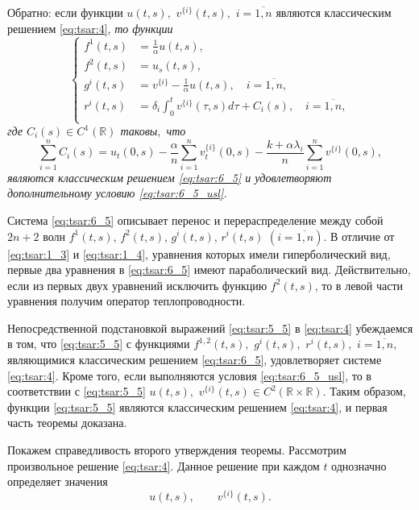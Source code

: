 Обратно: если функции $u(t,s),$ $v^{\{i\}}(t,s),$ 
$i = \overline{ 1,n }$ являются классическим решением \rm \eqref{eq:tsar:4}, \it то функции 
\begin{equation}
\left\{
\begin{aligned}
{f^1}(t,s) &= \frac{1}{\alpha} u(t,s) , \\
{f^2}(t,s) &= u_s(t,s) , \\
{g^{i}}(t,s) &=  v^{\{i\}} - \frac{1}{\alpha} u(t,s) , \quad i = \overline{ 1, n }, \\
{r^{i}}(t,s) &=  \delta_i \int_0^t v^{\{i\}} (\tau,s) d\tau + C_i(s), \quad i = \overline{ 1, n }, \\
\end{aligned}
\right.
\label{eq:tsar:Z_K_21}
\end{equation}
где $C_i(s)\in C^1({\mathbb R})$ таковы$,$ что 
$$\sum_{i=1}^{n} C_i(s)= u_t(0,s) -  \frac \alpha n \sum_{i=1}^{n} v^{\{i\}}_t(0,s) - \frac{ k + \alpha \lambda_i } n \sum_{i=1}^{n} v^{\{i\}}(0,s),$$ 
являются классическим решением \eqref{eq:tsar:6_5} и удовлетворяют 
дополнительному условию \rm \eqref{eq:tsar:6_5_usl}.

\rm

\smallskip

Система \eqref{eq:tsar:6_5} описывает перенос и перераспределение между собой ${2n+2}$ волн ${f^1}(t,s)$, 
${f^2}(t,s)$, ${g^i}(t,s)$, ${r^i}(t,s)$ $(i = \overline{ 1,n })$. В отличие от \eqref{eq:tsar:1_3} и \eqref{eq:tsar:1_4}, 
уравнения которых имели гиперболический вид, 
первые два уравнения в \eqref{eq:tsar:6_5} имеют параболический вид. Действительно, если из первых двух 
уравнений исключить функцию $f^2(t,s)$, то в левой части уравнения получим оператор теплопроводности.

\smallskip

Непосредственной подстановкой выражений \eqref{eq:tsar:5_5} 
в \eqref{eq:tsar:4} убеждаемся в том, что \eqref{eq:tsar:5_5} с функциями 
${f^{1,2}}(t,s),$ $g^{i}(t,s),$ $r^{i}(t,s),$ $i = \overline{ 1,n },$ 
являющимися классическим решением \eqref{eq:tsar:6_5}, удовлетворяет системе \eqref{eq:tsar:4}. 
Кроме того, если выполняются условия  \eqref{eq:tsar:6_5_usl}, то в соответствии с \eqref{eq:tsar:5_5} 
$u(t,s),$ $v^{\{i\}}(t,s) \in C^2({\mathbb R \times \mathbb R })$. Таким образом, функции \eqref{eq:tsar:5_5} 
являются классическим решением \eqref{eq:tsar:4}, и первая часть теоремы доказана.

Покажем справедливость второго утверждения теоремы. 
Рассмотрим произвольное решение \eqref{eq:tsar:4}. 
Данное решение при каждом $t$ однозначно определяет значения
\begin{equation}
u(t,s)	 ,\qquad
v^{\{i\}}(t,s) .
\label{eq:tsar:Z_K_1}
\end{equation}

